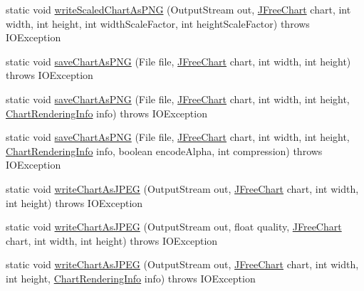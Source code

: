 \begin{DoxyCompactItemize}
\item 
static void \mbox{\hyperlink{classorg_1_1jfree_1_1chart_1_1_chart_utilities_a6dbd139ad302e4a7b076905a6b5c549c}{write\+Scaled\+Chart\+As\+P\+NG}} (Output\+Stream out, \mbox{\hyperlink{classorg_1_1jfree_1_1chart_1_1_j_free_chart}{J\+Free\+Chart}} chart, int width, int height, int width\+Scale\+Factor, int height\+Scale\+Factor)  throws I\+O\+Exception 
\item 
static void \mbox{\hyperlink{classorg_1_1jfree_1_1chart_1_1_chart_utilities_a5a2f8a0decb35c1cf353a74ac790498e}{save\+Chart\+As\+P\+NG}} (File file, \mbox{\hyperlink{classorg_1_1jfree_1_1chart_1_1_j_free_chart}{J\+Free\+Chart}} chart, int width, int height)  throws I\+O\+Exception 
\item 
static void \mbox{\hyperlink{classorg_1_1jfree_1_1chart_1_1_chart_utilities_a6dac41f5caaa56dba49b6b784e27da5d}{save\+Chart\+As\+P\+NG}} (File file, \mbox{\hyperlink{classorg_1_1jfree_1_1chart_1_1_j_free_chart}{J\+Free\+Chart}} chart, int width, int height, \mbox{\hyperlink{classorg_1_1jfree_1_1chart_1_1_chart_rendering_info}{Chart\+Rendering\+Info}} info)  throws I\+O\+Exception 
\item 
static void \mbox{\hyperlink{classorg_1_1jfree_1_1chart_1_1_chart_utilities_afecd6dd9aab3bbe013d1b287f0817947}{save\+Chart\+As\+P\+NG}} (File file, \mbox{\hyperlink{classorg_1_1jfree_1_1chart_1_1_j_free_chart}{J\+Free\+Chart}} chart, int width, int height, \mbox{\hyperlink{classorg_1_1jfree_1_1chart_1_1_chart_rendering_info}{Chart\+Rendering\+Info}} info, boolean encode\+Alpha, int compression)  throws I\+O\+Exception 
\item 
static void \mbox{\hyperlink{classorg_1_1jfree_1_1chart_1_1_chart_utilities_a304ba9a4a6966ac3772e663f8b8d6c0d}{write\+Chart\+As\+J\+P\+EG}} (Output\+Stream out, \mbox{\hyperlink{classorg_1_1jfree_1_1chart_1_1_j_free_chart}{J\+Free\+Chart}} chart, int width, int height)  throws I\+O\+Exception 
\item 
static void \mbox{\hyperlink{classorg_1_1jfree_1_1chart_1_1_chart_utilities_a5c4a89dba0b267856864390c3b99bea8}{write\+Chart\+As\+J\+P\+EG}} (Output\+Stream out, float quality, \mbox{\hyperlink{classorg_1_1jfree_1_1chart_1_1_j_free_chart}{J\+Free\+Chart}} chart, int width, int height)  throws I\+O\+Exception 
\item 
static void \mbox{\hyperlink{classorg_1_1jfree_1_1chart_1_1_chart_utilities_ad1a8e25b654094ed94b704bdd5fb9701}{write\+Chart\+As\+J\+P\+EG}} (Output\+Stream out, \mbox{\hyperlink{classorg_1_1jfree_1_1chart_1_1_j_free_chart}{J\+Free\+Chart}} chart, int width, int height, \mbox{\hyperlink{classorg_1_1jfree_1_1chart_1_1_chart_rendering_info}{Chart\+Rendering\+Info}} info)  throws I\+O\+Exception 

\end{DoxyCompactItemize}
